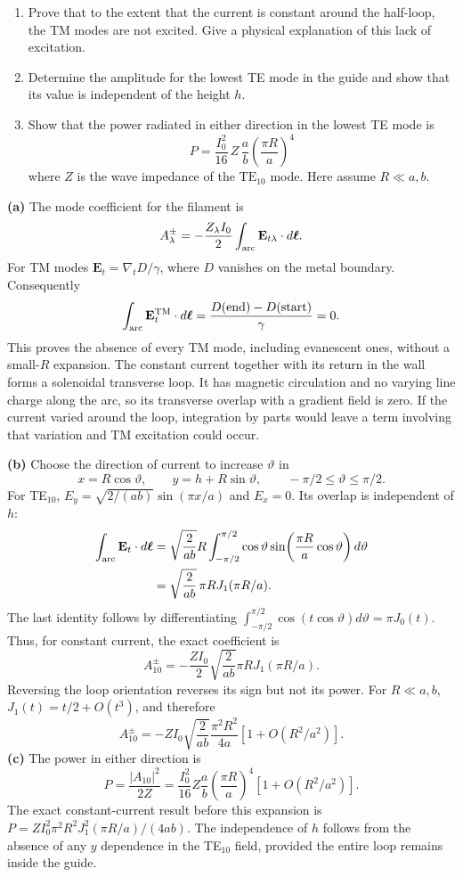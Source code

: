\begin{enumerate}
\item[(a)] Prove that to the extent that the current is constant around the half-loop, the TM modes are not excited. Give a physical explanation of this lack of excitation.
\item[(b)] Determine the amplitude for the lowest TE mode in the guide and show that its value is independent of the height $h$.
\item[(c)] Show that the power radiated in either direction in the lowest TE mode is
\[
P=\frac{I_{0}^{2}}{16}\,Z\,\frac{a}{b}\left(\frac{\pi R}{a}\right)^{4}
\]
where $Z$ is the wave impedance of the $\mathrm{TE}_{10}$ mode. Here assume $R\ll a,b$.
\end{enumerate}
\solution

\medskip\noindent\textbf{(a)} The mode coefficient for the filament is
\[
A_\lambda^{\pm}=-\frac{Z_\lambda I_0}{2}
 \int_{\rm arc}\mathbf E_{t\lambda}\cdot d\boldsymbol\ell.
\]
For TM modes $\mathbf E_t=\nabla_tD/\gamma$, where $D$ vanishes
on the metal boundary.  Consequently
\[
\int_{\rm arc}\mathbf E_t^{\rm TM}\cdot d\boldsymbol\ell
=\frac{D(\hbox{end})-D(\hbox{start})}{\gamma}=0.
\]
This proves the absence of every TM mode, including evanescent
ones, without a small-$R$ expansion.  The constant current together
with its return in the wall forms a solenoidal transverse loop.
It has magnetic circulation and no varying line charge along the
arc, so its transverse overlap with a gradient field is zero.
If the current varied around the loop, integration by parts would
leave a term involving that variation and TM excitation could occur.

\medskip\noindent\textbf{(b)} Choose the direction of current to increase
$\vartheta$ in
\[
x=R\cos\vartheta,\qquad y=h+R\sin\vartheta,
\qquad -\pi/2\leq\vartheta\leq\pi/2.
\]
For TE$_{10}$, $E_y=\sqrt{2/(ab)}\sin(\pi x/a)$ and $E_x=0$.
Its overlap is independent of $h$:
\begin{align*}
\int_{\rm arc}\mathbf E_t\cdot d\boldsymbol\ell
 &=\sqrt{\frac2{ab}}R\int_{-\pi/2}^{\pi/2}
 \cos\vartheta\sin\!\left(\frac{\pi R}{a}\cos\vartheta\right)d\vartheta\\
 &=\sqrt{\frac2{ab}}\,\pi R J_1(\pi R/a).
\end{align*}
The last identity follows by differentiating
$\int_{-\pi/2}^{\pi/2}\cos(t\cos\vartheta)d\vartheta=\pi J_0(t)$.
Thus, for constant current, the exact coefficient is
\[
\boxed{A_{10}^{\pm}=-\frac{ZI_0}2\sqrt{\frac2{ab}}
 \pi R J_1(\pi R/a).}
\]
Reversing the loop orientation reverses its sign but not its power.
For $R\ll a,b$, $J_1(t)=t/2+O(t^3)$, and therefore
\[
A_{10}^{\pm}=-ZI_0\sqrt{\frac2{ab}}\frac{\pi^2R^2}{4a}
 [1+O(R^2/a^2)].
\]
\medskip\noindent\textbf{(c)} The power in either direction is
\[
\boxed{P=\frac{|A_{10}|^2}{2Z}
 =\frac{I_0^2}{16}Z\frac ab
 \left(\frac{\pi R}{a}\right)^4
 [1+O(R^2/a^2)].}
\]
The exact constant-current result before this expansion is
$P=ZI_0^2\pi^2R^2J_1^2(\pi R/a)/(4ab)$.
The independence of $h$ follows from the absence of any $y$
dependence in the TE$_{10}$ field, provided the entire loop remains
inside the guide.

